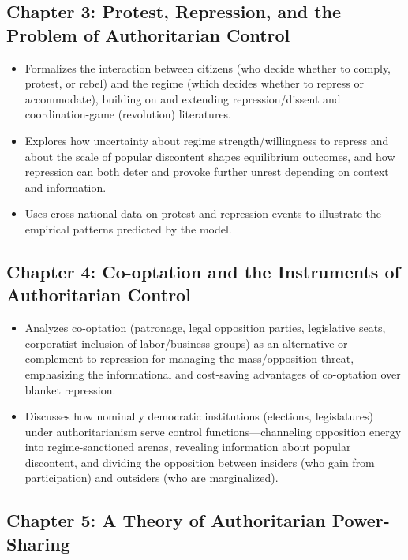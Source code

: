 \documentclass[12pt]{article}
\begin{document}
\subsection*{Chapter 3: Protest, Repression, and the Problem of Authoritarian Control}

\begin{itemize}[leftmargin=*, itemsep=4pt]
    \item Formalizes the interaction between citizens (who decide whether to comply, protest, or rebel) and the regime (which decides whether to repress or accommodate), building on and extending repression/dissent and coordination-game (revolution) literatures.
    \item Explores how uncertainty about regime strength/willingness to repress and about the scale of popular discontent shapes equilibrium outcomes, and how repression can both deter and provoke further unrest depending on context and information.
    \item Uses cross-national data on protest and repression events to illustrate the empirical patterns predicted by the model.
\end{itemize}

\subsection*{Chapter 4: Co-optation and the Instruments of Authoritarian Control}

\begin{itemize}[leftmargin=*, itemsep=4pt]
    \item Analyzes co-optation (patronage, legal opposition parties, legislative seats, corporatist inclusion of labor/business groups) as an alternative or complement to repression for managing the mass/opposition threat, emphasizing the informational and cost-saving advantages of co-optation over blanket repression.
    \item Discusses how nominally democratic institutions (elections, legislatures) under authoritarianism serve control functions---channeling opposition energy into regime-sanctioned arenas, revealing information about popular discontent, and dividing the opposition between insiders (who gain from participation) and outsiders (who are marginalized).
\end{itemize}

\subsection*{Chapter 5: A Theory of Authoritarian Power-Sharing}
\end{document}
